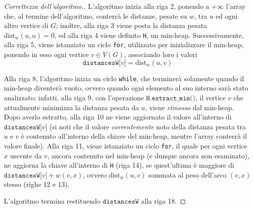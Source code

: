 \documentclass[a4paper, 12pt]{report}
\begin{document}
    \begin{proof}[Correttezza dell'algoritmo.]
        L'algoritmo inizia alla riga 2, ponendo a $+ \infty$ l'array che, al termine dell'algoritmo, conterrà le distanze, pesate su $w$, tra $u$ ed ogni altro vertice di $G$; inoltre, alla riga 3 viene posta la distanza pesata $\mathrm{dist}_w(u, u) = 0$, ed alla riga 4 viene definito \texttt{H}, un min-heap. Successivamente, alla riga 5, viene istanziato un ciclo \texttt{for}, utilizzato per inizializzare il min-heap, ponendo in esso ogni vertice $v \in V(G)$, associando loro i valori $$\texttt{distancesW[}v\texttt{]} = \mathrm{dist}_w(u, v)$$

        Alla riga 8, l'algoritmo inizia un ciclo \texttt{while}, che terminerà solamente quando il min-heap diventerà vuoto, ovvero quando ogni elemento al suo interno sarà stato analizzato; infatti, alla riga 9, con l'operazione $\texttt{H.extract\_min()}$, il vertice $v$ che attualmente minimizza la distanza pesata da $u$, viene \textit{rimosso} dal min-heap. Dopo averlo estratto, alla riga 10 ne viene aggiornato il valore all'interno di $\texttt{distancesW[}v\texttt{]}$ (si noti che il valore \textit{correntemente} noto della distanza pesata tra $u$ e $v$ è contenuto all'interno della chiave del min-heap, mentre l'array conterrà il valore finale). Alla riga 11, viene istanziato un ciclo \texttt{for}, il quale per ogni vertice $x$ uscente da $v$, ancora contenuto nel min-heap (e dunque ancora non esaminato), ne aggiorna la chiave all'interno di \texttt{H} (riga 14), se quest'ultima è maggiore di $\texttt{distancesW[}v \texttt{]} + w(v, x)$, ovvero $\mathrm{dist}_w(u, v)$ sommata al peso dell'arco $(v, x)$ stesso (righe 12 e 13).

        L'algoritmo termina restituendo $\texttt{distancesW}$ alla riga 18.
    \end{proof}
\end{document}
